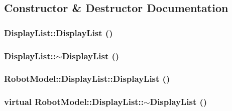\subsection{Constructor \& Destructor Documentation}
\hypertarget{class_robot_model_1_1_display_list_a71d74802d0190f52c0c4ad7c6d5351f9}{
\subsubsection[{DisplayList}]{\setlength{\rightskip}{0pt plus 5cm}DisplayList::DisplayList ()}}
\label{class_robot_model_1_1_display_list_a71d74802d0190f52c0c4ad7c6d5351f9}
\hypertarget{class_robot_model_1_1_display_list_a4c2105212d624723af920c798c1712cf}{
\subsubsection[{$\sim$DisplayList}]{\setlength{\rightskip}{0pt plus 5cm}DisplayList::$\sim$DisplayList ()}}
\label{class_robot_model_1_1_display_list_a4c2105212d624723af920c798c1712cf}
\hypertarget{class_robot_model_1_1_display_list_a4791b78bf5b3ce2edb821fd9318b7117}{
\subsubsection[{DisplayList}]{\setlength{\rightskip}{0pt plus 5cm}RobotModel::DisplayList::DisplayList ()}}
\label{class_robot_model_1_1_display_list_a4791b78bf5b3ce2edb821fd9318b7117}
\hypertarget{class_robot_model_1_1_display_list_a4f3dfbc4d5278bf34ce02738a55af6b7}{
\subsubsection[{$\sim$DisplayList}]{\setlength{\rightskip}{0pt plus 5cm}virtual RobotModel::DisplayList::$\sim$DisplayList ()}}
\label{class_robot_model_1_1_display_list_a4f3dfbc4d5278bf34ce02738a55af6b7}


